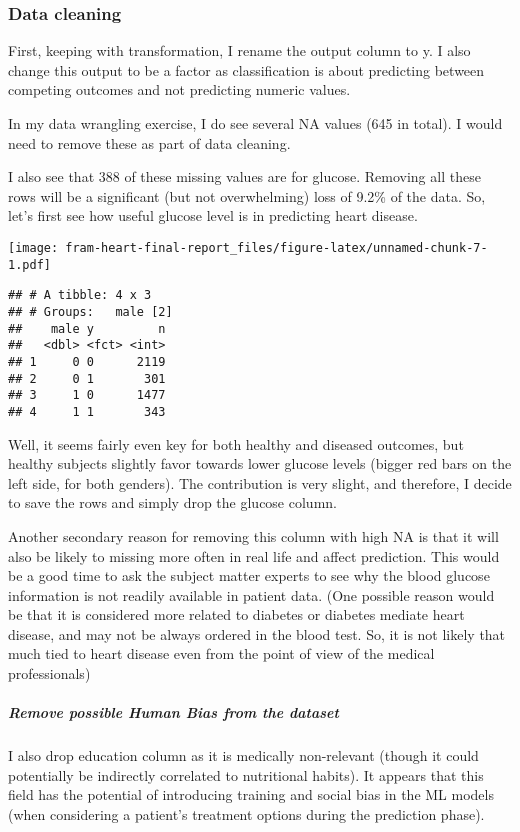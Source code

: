 \documentclass[]{article}
\let\oldsubparagraph\subparagraph
\renewcommand{\subparagraph}[1]{\oldsubparagraph{#1}\mbox{}}
\begin{document}
\subsubsection{Data cleaning}\label{data-cleaning}

First, keeping with transformation, I rename the output column to y. I
also change this output to be a factor as classification is about
predicting between competing outcomes and not predicting numeric values.

In my data wrangling exercise, I do see several NA values (645 in
total). I would need to remove these as part of data cleaning.

I also see that 388 of these missing values are for glucose. Removing
all these rows will be a significant (but not overwhelming) loss of
9.2\% of the data. So, let's first see how useful glucose level is in
predicting heart disease.

\texttt{[image: fram-heart-final-report\_files/figure-latex/unnamed-chunk-7-1.pdf]}

\begin{verbatim}
## # A tibble: 4 x 3
## # Groups:   male [2]
##    male y         n
##   <dbl> <fct> <int>
## 1     0 0      2119
## 2     0 1       301
## 3     1 0      1477
## 4     1 1       343
\end{verbatim}

Well, it seems fairly even key for both healthy and diseased outcomes,
but healthy subjects slightly favor towards lower glucose levels (bigger
red bars on the left side, for both genders). The contribution is very
slight, and therefore, I decide to save the rows and simply drop the
glucose column.

Another secondary reason for removing this column with high NA is that
it will also be likely to missing more often in real life and affect
prediction. This would be a good time to ask the subject matter experts
to see why the blood glucose information is not readily available in
patient data. (One possible reason would be that it is considered more
related to diabetes or diabetes mediate heart disease, and may not be
always ordered in the blood test. So, it is not likely that much tied to
heart disease even from the point of view of the medical professionals)

\subparagraph{Remove possible Human Bias from the
dataset}\label{remove-possible-human-bias-from-the-dataset}

I also drop education column as it is medically non-relevant (though it
could potentially be indirectly correlated to nutritional habits). It
appears that this field has the potential of introducing training and
social bias in the ML models (when considering a patient's treatment
options during the prediction phase).
\end{document}

